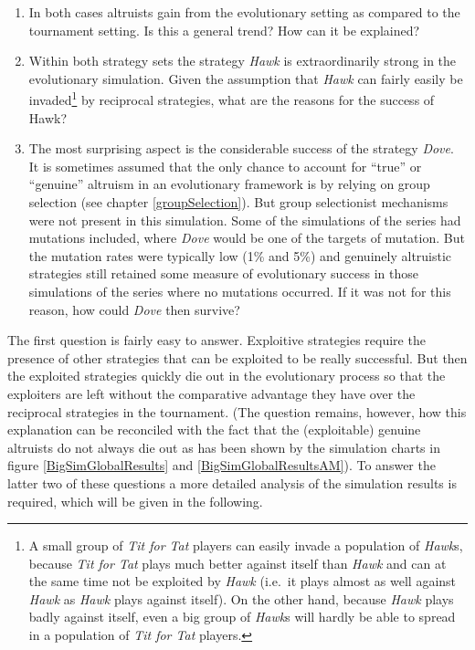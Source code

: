 \begin{enumerate}
\label{questions}

\item In both cases altruists gain from the evolutionary setting as compared
  to the tournament setting. Is this a general trend? How can it be explained?

\item Within both strategy sets the strategy {\em Hawk} is extraordinarily strong
  in the evolutionary simulation. Given the assumption that {\em Hawk} can
  fairly easily be invaded\footnote{A small group of {\em Tit for Tat} players
    can easily invade a population of {\em Hawk}s, because {\em Tit for Tat}
    plays much better against itself than {\em Hawk} and can at the same time
    not be exploited by {\em Hawk} (i.e.\ it plays almost as well against {\em
      Hawk} as {\em Hawk} plays against itself). On the other hand, because
    {\em Hawk} plays badly against itself, even a big group of {\em Hawk}s
    will hardly be able to spread in a population of {\em Tit for Tat}
    players.} by reciprocal strategies, what are the reasons for the success
  of Hawk?

\item The most surprising aspect is the considerable success of the strategy
  {\em Dove}. It is sometimes assumed that the only chance to account for
  ``true'' or ``genuine'' altruism in an evolutionary framework is by relying
  on group selection (see chapter \ref{groupSelection}). But group
  selectionist mechanisms were not present in this simulation. Some of the
  simulations of the series had mutations included, where {\em Dove} would be
  one of the targets of mutation. But the mutation rates were typically low
  (1\% and 5\%) and genuinely altruistic strategies still retained some
  measure of evolutionary success in those simulations of the series where no
  mutations occurred. If it was not for this reason, how could {\em Dove} then
  survive?

\end{enumerate}

The first question is fairly easy to answer. Exploitive strategies require the
presence of other strategies that can be exploited to be really successful.
But then the exploited strategies quickly die out in the evolutionary process
so that the exploiters are left without the comparative advantage they have
over the reciprocal strategies in the tournament. (The question remains,
however, how this explanation can be reconciled with the fact that the
(exploitable) genuine altruists do not always die out as has been shown by the
simulation charts in figure \ref{BigSimGlobalResults} and
\ref{BigSimGlobalResultsAM}). To answer the latter two of these questions a
more detailed analysis of the simulation results is required, which will be
given in the following.


